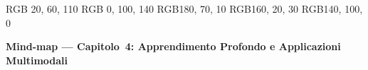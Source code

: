 
\definecolor{cRoot} {RGB}{ 20,  60, 110}
\definecolor{cCNN}  {RGB}{  0, 100, 140}
\definecolor{cMIL}  {RGB}{180,  70,  10}
\definecolor{cLLM}  {RGB}{160,  20,  30}
\definecolor{cBMS}  {RGB}{140, 100,   0}


\begin{center}
  {\large\bfseries Mind-map ---
   Capitolo~4: Apprendimento Profondo e Applicazioni Multimodali}
\end{center}

\vspace{-2pt}

